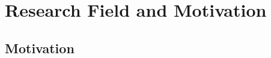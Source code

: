 \section{Research Field and Motivation}\label{sec:research_mot}

\subsection{Motivation}\label{subsec:motivation}

%
%
%
